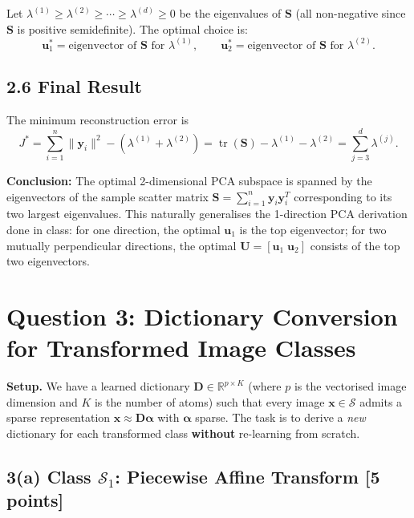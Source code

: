 \documentclass[11pt]{article}
\begin{document}
Let $\lambda^{(1)} \geq \lambda^{(2)} \geq \cdots \geq \lambda^{(d)} \geq 0$ be the eigenvalues
of $\boldsymbol{S}$ (all non-negative since $\boldsymbol{S}$ is positive semidefinite).
The optimal choice is:
\[
\boldsymbol{u}_1^* = \text{eigenvector of } \boldsymbol{S} \text{ for } \lambda^{(1)},\qquad
\boldsymbol{u}_2^* = \text{eigenvector of } \boldsymbol{S} \text{ for } \lambda^{(2)}.
\]

\subsection*{2.6 Final Result}

The minimum reconstruction error is
\[
J^* = \sum_{i=1}^n \|\boldsymbol{y}_i\|^2 - (\lambda^{(1)} + \lambda^{(2)})
= \operatorname{tr}(\boldsymbol{S}) - \lambda^{(1)} - \lambda^{(2)}
= \sum_{j=3}^{d}\lambda^{(j)}.
\]

\textbf{Conclusion:} The optimal 2-dimensional PCA subspace is spanned by the eigenvectors
of the sample scatter matrix $\boldsymbol{S} = \sum_{i=1}^n \boldsymbol{y}_i\boldsymbol{y}_i^T$
corresponding to its two largest eigenvalues. This naturally generalises the 1-direction
PCA derivation done in class: for one direction, the optimal $\boldsymbol{u}_1$ is the top
eigenvector; for two mutually perpendicular directions, the optimal
$\boldsymbol{U} = [\boldsymbol{u}_1\;\boldsymbol{u}_2]$ consists of the top two eigenvectors.

\newpage
\section*{Question 3: Dictionary Conversion for Transformed Image Classes}

\textbf{Setup.}
We have a learned dictionary $\boldsymbol{D} \in \mathbb{R}^{p \times K}$ (where $p$ is the
vectorised image dimension and $K$ is the number of atoms) such that every image
$\boldsymbol{x} \in \mathcal{S}$ admits a sparse representation
$\boldsymbol{x} \approx \boldsymbol{D}\boldsymbol{\alpha}$ with $\boldsymbol{\alpha}$ sparse.
The task is to derive a \emph{new} dictionary for each transformed class \textbf{without}
re-learning from scratch.

\subsection*{3(a) Class $\mathcal{S}_1$: Piecewise Affine Transform [5 points]}
\end{document}
